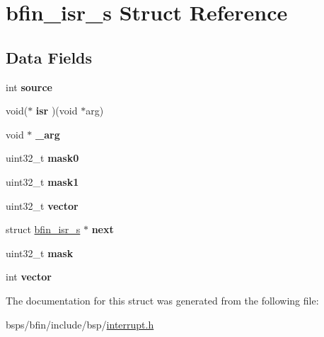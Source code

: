 \hypertarget{structbfin__isr__s}{}\section{bfin\+\_\+isr\+\_\+s Struct Reference}
\label{structbfin__isr__s}
\subsection*{Data Fields}
\begin{DoxyCompactItemize}
\item 
\mbox{\label{structbfin__isr__s_ad4f17c153b0fa33cd79f86bae77cdd3c}} 
int {\bfseries source}
\item 
\mbox{\label{structbfin__isr__s_a34aaac82025608816f069ad2177d854a}} 
void($\ast$ {\bfseries isr} )(void $\ast$arg)
\item 
\mbox{\label{structbfin__isr__s_ae479ea0b2997c94bed08f87c214e3527}} 
void $\ast$ {\bfseries \+\_\+arg}
\item 
\mbox{\label{structbfin__isr__s_a4401c0a01fee904f917a2fe2a26c7b76}} 
uint32\+\_\+t {\bfseries mask0}
\item 
\mbox{\label{structbfin__isr__s_a65d7fa51fbd4c928ea1971fec3d3432d}} 
uint32\+\_\+t {\bfseries mask1}
\item 
\mbox{\label{structbfin__isr__s_a659c81eb3a339a9c782124f945802f51}} 
uint32\+\_\+t {\bfseries vector}
\item 
\mbox{\label{structbfin__isr__s_acce38eef673f91b1cb5d42be538a7f39}} 
struct \mbox{\hyperlink{structbfin__isr__s}{bfin\+\_\+isr\+\_\+s}} $\ast$ {\bfseries next}
\item 
\mbox{\label{structbfin__isr__s_a661551e2889f75ea39be8c5f134550c9}} 
uint32\+\_\+t {\bfseries mask}
\item 
\mbox{\label{structbfin__isr__s_af4889ee0cb68029830696db554b16db7}} 
int {\bfseries vector}
\end{DoxyCompactItemize}


The documentation for this struct was generated from the following file\+:\begin{DoxyCompactItemize}
\item 
bsps/bfin/include/bsp/\mbox{\hyperlink{bsp_2interrupt_8h}{interrupt.\+h}}\end{DoxyCompactItemize}
